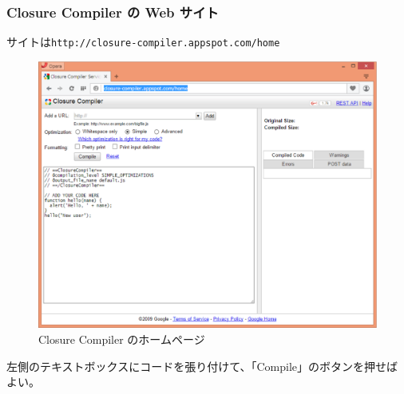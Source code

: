 \documentclass[dvipsk]{beamer}
\begin{document}
\begin{frame}[containsverbatim]
\frametitle{Closure Compiler の Web サイト}
 サイトは\texttt{http://closure-compiler.appspot.com/home}
 \begin{figure}[ht]
	\begin{center}
	 \includegraphics[width=1\textwidth]{../10-01closur-compiler-home.eps}
	\end{center}
 \caption{Closure Compiler のホームページ}\label{closure-compiler}
 \end{figure}
 左側のテキストボックスにコードを張り付けて、「Compile」のボタンを押せば
 よい。
\end{frame}
\end{document}
